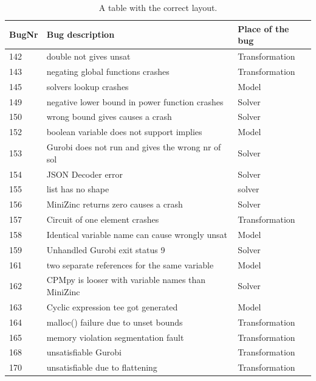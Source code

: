 \begin{table}[]
	\centering
	\begin{tabular}{lll}
	BugNr & Bug description                                         & Place of the bug \\ \toprule
	142   & double not gives unsat                                  & Transformation   \\
	143   & negating global functions crashes                       & Transformation   \\
	145   & solvers lookup crashes                                  & Model            \\
	149   & negative lower bound in power function crashes          & Solver           \\
	150   & wrong bound gives causes a crash                        & Solver           \\
	152   & boolean variable does not support implies               & Model            \\
	153   & Gurobi does not run and gives the wrong nr of sol       & Solver           \\
	154   & JSON Decoder error                                      & Solver           \\
	155   & list has no shape                                       & solver           \\
	156   & MiniZinc returns zero causes a crash                    & Solver           \\
	157   & Circuit of one element crashes                          & Transformation   \\
	158   & Identical variable name can cause wrongly unsat         & Model            \\
	159   & Unhandled Gurobi exit status 9                          & Solver           \\
	161   & two separate references for the same variable           & Model            \\
	162   & CPMpy is looser with variable names than MiniZinc       & Solver           \\
	163   & Cyclic expression tee got generated                     & Model            \\
	164   & malloc() failure due to unset bounds                    & Transformation   \\
	165   & memory violation segmentation fault                     & Transformation   \\
	168   & unsatisfiable Gurobi                                    & Transformation   \\
	170   & unsatisfiable due to flattening                         & Transformation   \\ \bottomrule        
	\end{tabular}
	\caption{A table with the correct layout.}
	\label{tab:bug:place}
\end{table}

